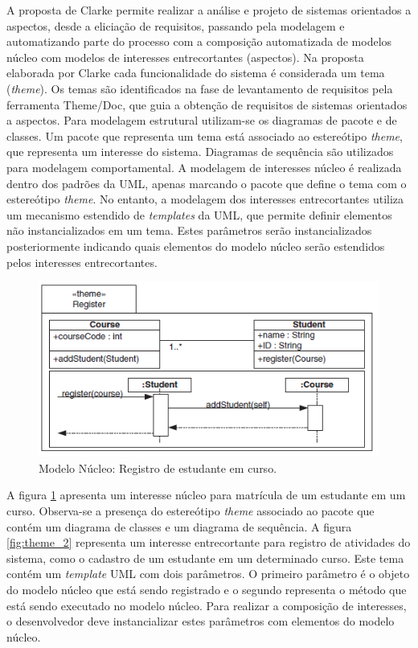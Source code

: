 A proposta de Clarke \cite{clarke:04} permite realizar a análise e projeto de sistemas orientados a aspectos, desde a eliciação de requisitos,
passando pela modelagem e automatizando parte do processo com a composição automatizada de modelos núcleo com modelos de interesses entrecortantes
(aspectos). Na proposta elaborada por Clarke cada funcionalidade do sistema é considerada um tema (\textit{theme}). Os temas são identificados na fase
de levantamento de requisitos pela ferramenta Theme/Doc, que guia a obtenção de requisitos de sistemas orientados a aspectos. Para modelagem
estrutural utilizam-se os diagramas de pacote e de classes. Um pacote que representa um tema está associado ao estereótipo \textit{theme}, 
que representa um interesse do sistema. Diagramas de sequência são utilizados para modelagem comportamental. A modelagem de interesses
núcleo é realizada dentro dos padrões da UML, apenas marcando o pacote que define o tema com o estereótipo \textit{theme}. No entanto, a modelagem dos
interesses entrecortantes utiliza um mecanismo estendido de \textit{templates} da UML, que permite definir elementos não instancializados em um tema. 
Estes parâmetros serão instancializados posteriormente indicando quais elementos do modelo núcleo serão estendidos pelos interesses
entrecortantes. 

\begin{figure}
	\centering
	\includegraphics{img/theme_1.png}
	\caption{Modelo Núcleo: Registro de estudante em curso.}\label{fig:theme_1}
\end{figure}

A figura \ref{fig:theme_1} apresenta um interesse núcleo para matrícula de um estudante em um curso. Observa-se a presença do estereótipo
\textit{theme} associado ao pacote que contém um diagrama de classes e um diagrama de sequência. A figura \ref{fig:theme_2} representa um interesse
entrecortante para registro de atividades do sistema, como o cadastro de um estudante em um determinado curso. Este tema contém um \textit{template}
UML com dois parâmetros. O primeiro parâmetro é o objeto do modelo núcleo que está sendo registrado e o segundo representa o método que está sendo
executado no modelo núcleo. Para realizar a composição de interesses, o desenvolvedor deve instancializar estes parâmetros com elementos do modelo
núcleo.

